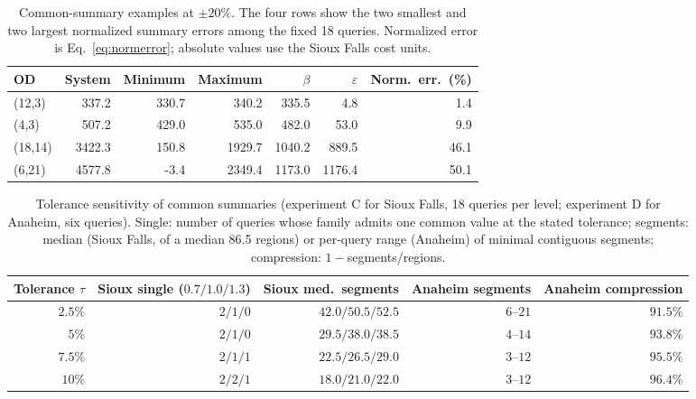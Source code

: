 \begin{table}[pos=htbp]\centering\footnotesize\caption{Common-summary examples at $\pm20\%$. The four rows show the two smallest and two largest normalized summary errors among the fixed 18 queries. Normalized error is Eq.~\eqref{eq:normerror}; absolute values use the Sioux Falls cost units.}\label{tab:coverage_summary}\begin{tabular}{lrrrrrr}\toprule OD & System & Minimum & Maximum & $\beta$ & $\varepsilon$ & Norm.\ err.\ (\%)\\\midrule
(12,3) & 337.2 & 330.7 & 340.2 & 335.5 & 4.8 & 1.4\\
(4,3) & 507.2 & 429.0 & 535.0 & 482.0 & 53.0 & 9.9\\
(18,14) & 3422.3 & 150.8 & 1929.7 & 1040.2 & 889.5 & 46.1\\
(6,21) & 4577.8 & -3.4 & 2349.4 & 1173.0 & 1176.4 & 50.1\\
\bottomrule\end{tabular}\end{table}

\begin{table}[pos=htbp]\centering\footnotesize
\caption{Tolerance sensitivity of common summaries (experiment C for
Sioux Falls, 18 queries per level; experiment D for Anaheim, six
queries). Single: number of queries whose family admits one common
value at the stated tolerance; segments: median (Sioux Falls, of a
median 86.5 regions) or per-query range (Anaheim) of minimal contiguous
segments; compression: $1-$segments/regions.}\label{tab:tolerance}
\begin{tabular}{rrrrr}\toprule
Tolerance $\tau$ & Sioux single ($0.7/1.0/1.3$) & Sioux med.\ segments & Anaheim segments & Anaheim compression\\\midrule
$2.5\%$ & $2/1/0$ & $42.0/50.5/52.5$ & $6$--$21$ & $91.5\%$\\
$5\%$ & $2/1/0$ & $29.5/38.0/38.5$ & $4$--$14$ & $93.8\%$\\
$7.5\%$ & $2/1/1$ & $22.5/26.5/29.0$ & $3$--$12$ & $95.5\%$\\
$10\%$ & $2/2/1$ & $18.0/21.0/22.0$ & $3$--$12$ & $96.4\%$\\
\bottomrule\end{tabular}\end{table}

